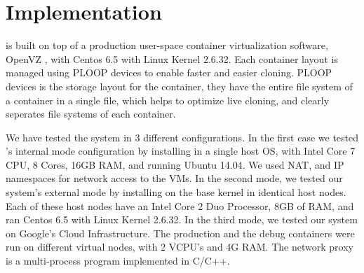 
\section{Implementation}
\label{sec:implementation}

\parikshan is built on top of a production user-space container virtualization software, OpenVZ \cite{openvz}, with Centos 6.5 with Linux Kernel 2.6.32.
Each container layout is managed using PLOOP\cite{ploop} devices to enable faster and easier cloning.
PLOOP devices is the storage layout for the container, they have the entire file system of a container in a single file, which helps to optimize live cloning, and clearly seperates file systems of each container.

We have tested the system in 3 different configurations. In the first case we tested \parikshan 's internal mode configuration by installing \parikshan in a single host OS, with Intel Core 7 CPU, 8 Cores, 16GB RAM, and running Ubuntu 14.04. 
We used NAT, and IP namespaces for network access to the VMs.
In the second mode, we tested our system's external mode by installing \parikshan on the base kernel in identical host nodes. 
Each of these host nodes have an Intel Core 2 Duo Processor, 8GB of RAM, and ran Centos 6.5 with Linux Kernel 2.6.32.
In the third mode, we tested our system on Google's Cloud Infrastructure.
The production and the debug containers were run on different virtual nodes, with 2 VCPU's and 4G RAM. 
The network proxy is a multi-process program implemented in C/C++.

